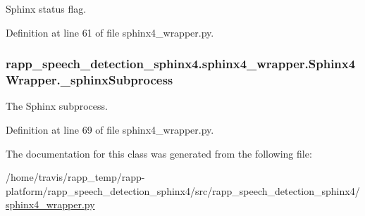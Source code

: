 Sphinx status flag. 



Definition at line 61 of file sphinx4\-\_\-wrapper.\-py.

\hypertarget{classrapp__speech__detection__sphinx4_1_1sphinx4__wrapper_1_1Sphinx4Wrapper_ace5cad8dbe7ccd9870d3dadc165cff0e}{
\subsubsection[{\-\_\-sphinx\-Subprocess}]{\setlength{\rightskip}{0pt plus 5cm}rapp\-\_\-speech\-\_\-detection\-\_\-sphinx4.\-sphinx4\-\_\-wrapper.\-Sphinx4\-Wrapper.\-\_\-sphinx\-Subprocess\hspace{0.3cm}{\ttfamily [private]}}}\label{classrapp__speech__detection__sphinx4_1_1sphinx4__wrapper_1_1Sphinx4Wrapper_ace5cad8dbe7ccd9870d3dadc165cff0e}


The Sphinx subprocess. 



Definition at line 69 of file sphinx4\-\_\-wrapper.\-py.



The documentation for this class was generated from the following file\-:\begin{DoxyCompactItemize}
\item 
/home/travis/rapp\-\_\-temp/rapp-\/platform/rapp\-\_\-speech\-\_\-detection\-\_\-sphinx4/src/rapp\-\_\-speech\-\_\-detection\-\_\-sphinx4/\hyperlink{sphinx4__wrapper_8py}{sphinx4\-\_\-wrapper.\-py}\end{DoxyCompactItemize}
